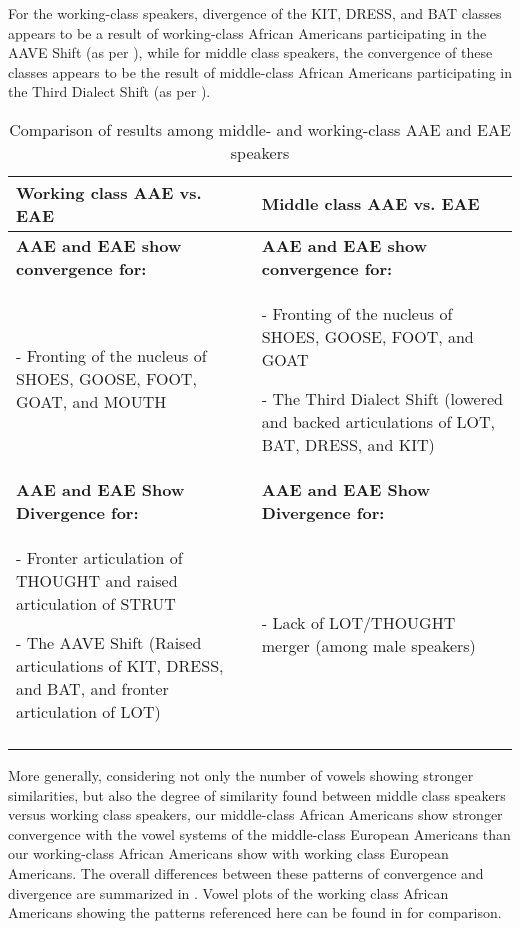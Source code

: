 \documentclass[output=paper,colorlinks,citecolor=brown]{langscibook}
\begin{document}
 For the working-class speakers, divergence of the KIT, DRESS, and BAT classes appears to be a result of working-class African Americans participating in the AAVE Shift (as per \citealt{Thomas2007phonological}), while for middle class speakers, the convergence of these classes appears to be the result of middle-class African Americans participating in the Third Dialect Shift (as per \citealt{durian2012new}).


\begin{table}
\small
\begin{tabularx}{\textwidth}{QQ}
\lsptoprule

\textbf{Working class AAE vs. EAE} & \textbf{Middle class AAE vs. EAE}\\
\midrule
{\textbf{AAE and EAE show convergence for:}} & {\textbf{AAE and EAE show convergence for:}}\\
- Fronting of the nucleus of SHOES, GOOSE, FOOT, GOAT, and MOUTH & - Fronting of the nucleus of SHOES, GOOSE, FOOT, and GOAT\medskip


- The Third Dialect Shift (lowered and backed articulations of LOT, BAT, DRESS, and  KIT)\\
\tablevspace
\midrule
{\textbf{AAE and EAE Show Divergence for:}} & {\textbf{AAE and EAE Show Divergence for:}}\\
- Fronter articulation of THOUGHT and raised articulation of STRUT\medskip

- The AAVE Shift (Raised articulations of KIT, DRESS, and BAT, and fronter articulation of LOT)  & - Lack of LOT/THOUGHT merger (among male speakers)\\
\lspbottomrule
\end{tabularx}

\caption{Comparison of results among middle- and working-class AAE and EAE speakers}
\label{tab:durian:4}
\end{table}

\begin{sloppypar}
More generally, considering not only the number of vowels showing stronger similarities, but also the degree of similarity found between middle class speakers versus working class speakers, our middle-class African Americans show stronger convergence with the vowel systems of the middle-class European Americans than our working-class African Americans show with working class European Americans. The overall differences between these patterns of convergence and divergence are summarized in . Vowel plots of the working class African Americans showing the patterns referenced here can be found in \citet{Durianschumacher2010} for comparison.
\end{sloppypar}
\end{document}
